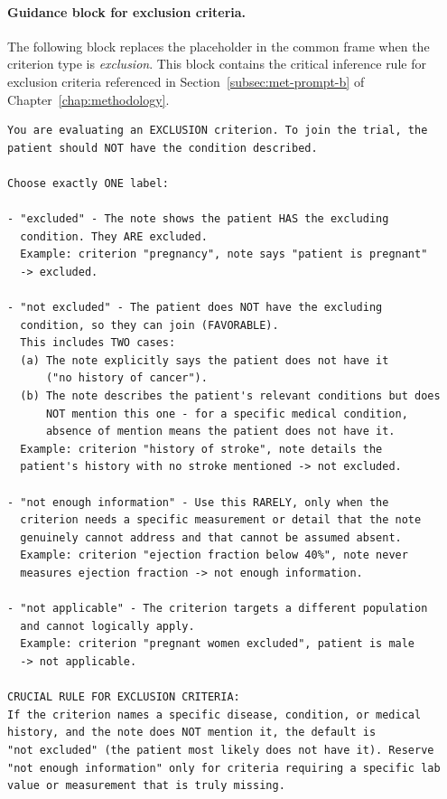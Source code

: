 \paragraph{Guidance block for exclusion criteria.}
The following block replaces the placeholder in the common frame when 
the criterion type is \emph{exclusion}. This block contains the 
critical inference rule for exclusion criteria referenced in 
Section~\ref{subsec:met-prompt-b} of Chapter~\ref{chap:methodology}.

\begin{lstlisting}[caption={Prompt B for Instruct models --- exclusion 
    guidance}, label={lst:prompt-b-instruct-excl}, 
    breaklines=true, basicstyle=\ttfamily\small]
You are evaluating an EXCLUSION criterion. To join the trial, the
patient should NOT have the condition described.

Choose exactly ONE label:

- "excluded" - The note shows the patient HAS the excluding
  condition. They ARE excluded.
  Example: criterion "pregnancy", note says "patient is pregnant"
  -> excluded.

- "not excluded" - The patient does NOT have the excluding
  condition, so they can join (FAVORABLE).
  This includes TWO cases:
  (a) The note explicitly says the patient does not have it
      ("no history of cancer").
  (b) The note describes the patient's relevant conditions but does
      NOT mention this one - for a specific medical condition,
      absence of mention means the patient does not have it.
  Example: criterion "history of stroke", note details the
  patient's history with no stroke mentioned -> not excluded.

- "not enough information" - Use this RARELY, only when the
  criterion needs a specific measurement or detail that the note
  genuinely cannot address and that cannot be assumed absent.
  Example: criterion "ejection fraction below 40%", note never
  measures ejection fraction -> not enough information.

- "not applicable" - The criterion targets a different population
  and cannot logically apply.
  Example: criterion "pregnant women excluded", patient is male
  -> not applicable.

CRUCIAL RULE FOR EXCLUSION CRITERIA:
If the criterion names a specific disease, condition, or medical
history, and the note does NOT mention it, the default is
"not excluded" (the patient most likely does not have it). Reserve
"not enough information" only for criteria requiring a specific lab
value or measurement that is truly missing.
\end{lstlisting}


